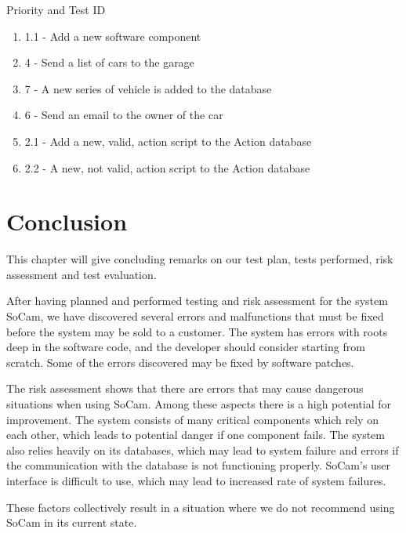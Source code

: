 		Priority and Test ID
		\begin{enumerate}
			\item 1.1 - Add a new software component
			\item 4 - Send a list of cars to the garage
			\item 7 - A new series of vehicle is added to the database
			\item 6 - Send an email to the owner of the car
			\item 2.1 - Add a new, valid, action script to the Action database
			\item 2.2 - A new, not valid, action script to the Action database

		\end{enumerate}	


	\section{Conclusion}

		This chapter will give concluding remarks on our test plan, tests performed, risk assessment and test evaluation. 

		After having planned and performed testing and risk assessment for the system SoCam, we have discovered several errors and malfunctions that must be fixed before the system may be sold to a customer. The system has errors with roots deep in the software code, and the developer should consider starting from scratch. Some of the errors discovered may be fixed by software patches. 

		The risk assessment shows that there are errors that may cause dangerous situations when using SoCam. Among these aspects there is a high potential for improvement. The system consists of many critical components which rely on each other, which leads to potential danger if one component fails. The system also relies heavily on its databases, which may lead to system failure and errors if the communication with the database is not functioning properly. SoCam’s user interface is difficult to use, which may lead to increased rate of system failures. 

		These factors collectively result in a situation where we do not recommend using SoCam in its current state.


